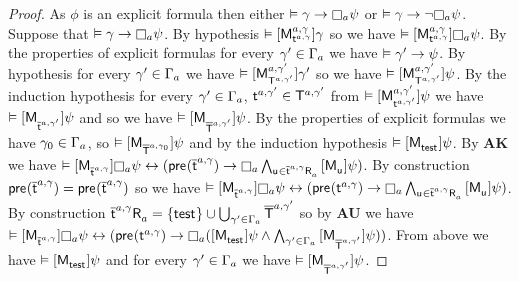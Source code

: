 \begin{proof}
As $\phi$ is an explicit formula then either $\entails \gamma \implies \necessaryA \psi$ or $\entails \gamma \implies \lnot \necessaryA \psi$.
Suppose that $\entails \gamma \implies \necessaryA \psi$.
By hypothesis $\entails \actionA{\aPModel[\agentA, \gamma]{\aStateT[\agentA, \gamma]}} \gamma$ so we have $\entails \actionA{\aPModel[\agentA, \gamma]{\aStateT[\agentA, \gamma]}} \necessaryA \psi$.
By the properties of explicit formulas for every $\gamma' \in \Gamma_\agentA$ we have $\entails \gamma' \implies \psi$.
By hypothesis for every $\gamma' \in \Gamma_\agentA$ we have $\entails \actionA{\aPModel[\agentA, \gamma']{\aStatesT[\agentA, \gamma']}} \gamma'$ so we have $\entails \actionA{\aPModel[\agentA, \gamma']{\aStatesT[\agentA, \gamma']}} \psi$.
By the induction hypothesis for every $\gamma' \in \Gamma_\agentA$, $\aStateT[\agentA, \gamma'] \in \aStatesT[\agentA, \gamma']$ from
$\entails \actionA{\aPModel[\agentA, \gamma']{\aStateT[\agentA, \gamma']}} \psi$ we have
$\entails \actionA{\aPModel{\aPStateT[\agentA, \gamma']}} \psi$ and so we have
$\entails \actionA{\aPModel{\aPStatesT[\agentA, \gamma']}} \psi$.
By the properties of explicit formulas we have $\gamma_0 \in \Gamma_\agentA$, so $\entails \actionA{\aPModel{\aPStatesT[\agentA, \gamma_0]}} \psi$ and by the induction hypothesis $\entails \actionA{\aPModel{\aStateTest}} \psi$.
By {\bf AK} we have $\entails \actionA{\aPModel{\aPStateT[\agentA, \gamma]}} \necessaryA \psi \iff (\aPrecondition(\aPStateT[\agentA, \gamma]) \implies \necessaryA \bigwedge_{\aStateU \in \aSuccessorsA{\aPStateT[\agentA, \gamma]}} \actionA{\aPModel{\aStateU}} \psi)$.
By construction $\aPrecondition(\aPStateT[\agentA, \gamma]) = \aPrecondition(\aPStateT[\agentA, \gamma])$ so we have $\entails \actionA{\aPModel{\aPStateT[\agentA, \gamma]}} \necessaryA \psi \iff (\aPrecondition(\aStateT[\agentA, \gamma]) \implies \necessaryA \bigwedge_{\aStateU \in \aSuccessorsA{\aPStateT[\agentA, \gamma]}} \actionA{\aPModel{\aStateU}} \psi)$.
By construction $\aSuccessorsA{\aPStateT[\agentA, \gamma]} = \{\aStateTest\} \cup \bigcup_{\gamma' \in \Gamma_\agentA} \aPStatesT[\agentA, \gamma']$ so by {\bf AU} we have $\entails \actionA{\aPModel{\aPStateT[\agentA, \gamma]}} \necessaryA \psi \iff (\aPrecondition(\aStateT[\agentA, \gamma]) \implies \necessaryA (\actionA{\aPModel{\aStateTest}} \psi \land \bigwedge_{\gamma' \in \Gamma_\agentA} \actionA{\aPModel{\aPStatesT[\agentA, \gamma']}} \psi))$.
From above we have $\entails \actionA{\aPModel{\aStateTest}} \psi$ and for every $\gamma' \in \Gamma_\agentA$ we have $\entails \actionA{\aPModel{\aPStatesT[\agentA, \gamma']}} \psi$.

\end{proof}
